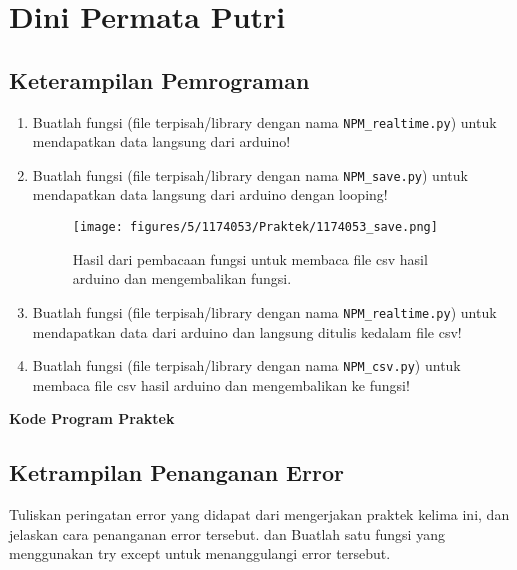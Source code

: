 \section{Dini Permata Putri}
\subsection{Keterampilan Pemrograman}
\begin{enumerate}
	\item Buatlah  fungsi  (file  terpisah/library  dengan  nama  \verb|NPM_realtime.py|)  untuk mendapatkan data langsung dari arduino!

	
	
	\item Buatlah fungsi (file terpisah/library dengan nama \verb|NPM_save.py|) untuk mendapatkan data langsung dari arduino dengan looping!
	
	

\begin{figure}[ht]
	\texttt{[image: figures/5/1174053/Praktek/1174053\_save.png]}
	\centering
	\caption{Hasil dari pembacaan fungsi untuk membaca file csv hasil arduino dan mengembalikan fungsi.}
\end{figure}

	\item Buatlah  fungsi  (file  terpisah/library  dengan  nama  \verb|NPM_realtime.py|) untuk mendapatkan data dari arduino dan langsung ditulis kedalam file csv!
	
	

	\item Buatlah fungsi (file terpisah/library dengan nama \verb|NPM_csv.py|) untuk membaca file csv hasil arduino dan mengembalikan ke fungsi!
	
	

\end{enumerate}

\textbf{Kode Program Praktek}

\subsection{Ketrampilan Penanganan Error}
Tuliskan  peringatan  error  yang  didapat  dari  mengerjakan  praktek  kelima  ini, dan  jelaskan  cara  penanganan  error  tersebut.   dan  Buatlah  satu  fungsi  yang menggunakan try except untuk menanggulangi error tersebut.

